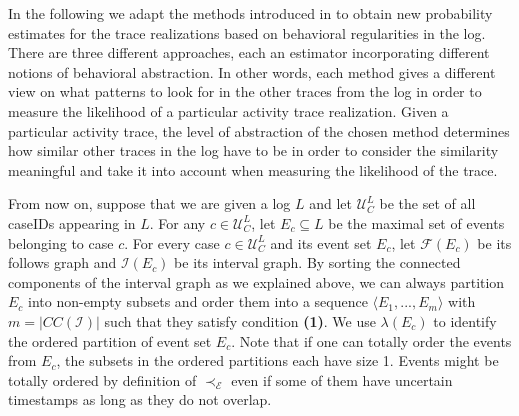 In the following we adapt the methods introduced in \cite{por} to obtain new probability estimates for the trace realizations based on behavioral regularities in the log.
There are three different approaches, each an estimator incorporating different notions of behavioral abstraction.
In other words, each method gives a different view on what patterns to look for in the other traces from the log in order to measure the likelihood of a particular activity trace realization.
Given a particular activity trace, the level of abstraction of the chosen method determines how similar other traces in the log have to be in order to consider the similarity meaningful and take it into account when measuring the likelihood of the trace.

From now on, suppose that we are given a log $L$ and let $\mathcal{U}_C^L$ be the set of all caseIDs appearing in $L$.
For any $c \in \mathcal{U}_C^L$, let $E_c \subseteq L$ be the maximal set of events belonging to case $c$.
For every case $c \in \mathcal{U}_C^L$ and its event set $E_c$, let $\mathcal{F}(E_c)$ be its follows graph and $\mathcal{I}(E_c)$ be its interval graph.
By sorting the connected components of the interval graph as we explained above, we can always partition $E_c$ into non-empty subsets and order them into a sequence $\langle E_1,...,E_m\rangle$ with $m=|CC(\mathcal{I})|$ such that they satisfy condition \textbf{(1)}.
We use $\lambda(E_c)$ to identify the ordered partition of event set $E_c$.
Note that if one can totally order the events from $E_c$, the subsets in the ordered partitions each have size 1.
Events might be totally ordered by definition of $\prec_{\mathcal{E}}$ even if some of them have uncertain timestamps as long as they do not overlap.


